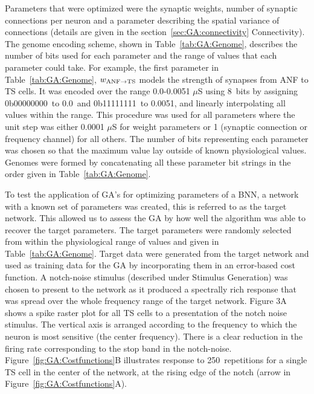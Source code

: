 \smallskip{} 

Parameters that were optimized were the synaptic weights, number of
synaptic connections per neuron and a parameter describing the spatial
variance of connections (details are given in the
section~\ref{sec:GA:connectivity} Connectivity). The genome encoding
scheme, shown in Table~\ref{tab:GA:Genome}, describes the number of bits
used for each parameter and the range of values that each parameter
could take.  For example, the first parameter in Table~\ref{tab:GA:Genome},
$w_{{\rm ANF}\to{\rm TS}}$ models the strength of synapses from ANF to
TS cells. It was encoded over the range 0.0-0.0051 $\mu$S using 8~bits
by assigning 0b00000000~to 0.0~and 0b11111111~to 0.0051, and linearly
interpolating all values within the range. This procedure was used for
all parameters where the unit step was either 0.0001 $\mu$S for weight
parameters or 1 (synaptic connection or frequency channel) for all
others. The number of bits representing each parameter was chosen so
that the maximum value lay outside of known physiological
values. Genomes were formed by concatenating all these parameter bit
strings in the order given in Table~\ref{tab:GA:Genome}.

\smallskip{}

To test the application of GA's for optimizing parameters of a BNN, a
network with a known set of parameters was created, this is referred
to as the target network.  This allowed us to assess the GA by how
well the algorithm was able to recover the target parameters. The
target parameters were randomly selected from within the physiological
range of values and given in Table~\ref{tab:GA:Genome}.  Target data
were generated from the target network and used as training data for
the GA by incorporating them in an error-based cost function.  A
notch-noise stimulus (described under Stimulus Generation) was chosen
to present to the network as it produced a spectrally rich response
that was spread over the whole frequency range of the target network.
Figure 3A shows a spike raster plot for all TS cells to a presentation
of the notch noise stimulus. The vertical axis is arranged according
to the frequency to which the neuron is most sensitive (the center
frequency). There is a clear reduction in the firing rate
corresponding to the stop band in the
notch-noise. Figure~\ref{fig:GA:Costfunctions}B illustrates response
to 250~repetitions for a single TS cell in the center of the network,
at the rising edge of the notch (arrow in
Figure~\ref{fig:GA:Costfunctions}A).

